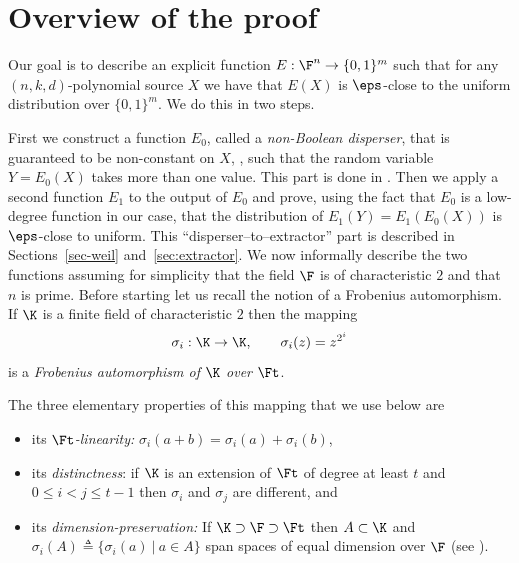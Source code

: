 \section{Overview of the proof}

Our goal is to describe an explicit function $E:\F^n \to \{0,1\}^m$
such that for any $(n,k,d)$-polynomial source $X$ we have that
$E(X)$ is $\eps$-close to the
%
%
uniform distribution over $\{0,1\}^m$.  We do this in two steps.

First we construct a function $E_0$, called a \emph{non-Boolean disperser}, that is guaranteed to be non-constant on $X$, \ie,
such that the 
%
%
random variable $Y=E_0(X)$ takes more than one value.
This part is done in .
Then we apply a second function $E_1$ to the output of $E_0$ and prove, using the fact that $E_0$ is a low-degree function in our case, 
that the distribution of %
$E_1(Y)=E_1(E_0(X))$ is $\eps$-close to uniform.
 This ``disperser--to--extractor'' part is described in Sections~\ref{sec-weil} and~\ref{sec:extractor}.
 We now informally describe the two functions assuming for simplicity
that %
the field $\F$ is of characteristic $2$ and that $n$ is prime.
Before starting let us recall the notion of a Frobenius automorphism.
If $\K$ is a finite field of characteristic $2$ then the mapping
\[\sigma_i:\K\to \K, \qquad \sigma_i(z)=z^{2^i}\] is a
\emph{Frobenius automorphism of $\K$ over $\Ft$}.
%
%
%

%
%
%
%
%
%
%
%

%
%
%
%
The three elementary properties of this mapping that we use below are
%
%
%
%
%
%
%
%
%
%
\begin{itemize}
\item[(i)] its \emph{$\Ft$-linearity:} $\sigma_i(a+b)=\sigma_i(a)+\sigma_i(b)$,
\item[(ii)] its \emph{distinctness}: if $\K$ is an extension of $\Ft$ of
   degree at least $t$ and $0\leq i<j\leq t-1$ then $\sigma_i$ and
   $\sigma_j$ are different, and
\item[(iii)] its \emph{dimension-preservation:} If $\K\supset\F\supset\Ft$
 then $A\subset \K$ and $\sigma_i(A)\triangleq \{\sigma_i(a) \ | \ a\in A\}$
 span spaces of equal dimension over $\F$
 (see ).
\end{itemize}

